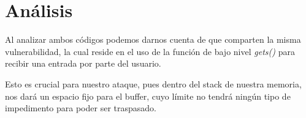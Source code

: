 \section{Análisis}

Al analizar ambos códigos podemos darnos cuenta de que comparten la misma vulnerabilidad, la cual reside en el uso de la función de bajo nivel \textit{gets()} para recibir una entrada por parte del usuario.

Esto es crucial para nuestro ataque, pues dentro del stack de nuestra memoria, nos dará un espacio fijo para el buffer, cuyo límite no tendrá ningún tipo de impedimento para poder ser traspasado.

